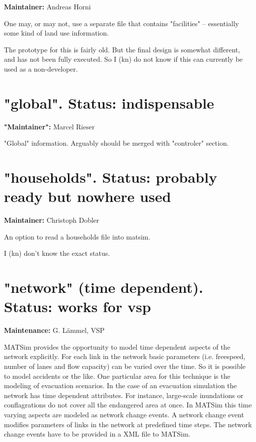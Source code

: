\textbf{Maintainer:} Andreas Horni

One may, or may not, use a separate file that contains "facilities" – essentially some kind of land use information.

The prototype for this is fairly old. But the final design is  somewhat different, and has not been fully executed. So I (kn) do  not know if this can currently be used as a non-developer.

\vfill\eject
\section{"global". Status: indispensable}

\textbf{"Maintainer":} Marcel Rieser

"Global" information. Arguably should be merged with "controler" section.

\vfill\eject
\section{"households". Status: probably ready but nowhere used}

\textbf{Maintainer:} Christoph Dobler

An option to read a households file into matsim.

I (kn) don't know the exact status.

\vfill\eject
\section{"network" (time dependent). Status: works for vsp}

\textbf{Maintenance:} G. Lämmel, VSP

MATSim provides the opportunity to model time dependent aspects of  the network explicitly. For each link in the network basic parameters  (i.e. freespeed, number of lanes and flow capacity) can be varied over  the time. So it is possible to model accidents or the like. One  particular area for this technique is the modeling of evacuation  scenarios.
In the case of an evacuation simulation the network has time dependent  attributes. For instance, large-scale inundations or conflagrations do  not cover all the endangered area at once.
In MATSim this time varying aspects are modeled as network change  events. A network change event modifies parameters of links in the  network at predefined time steps. The network change events have to be  provided in a XML file to MATSim.

